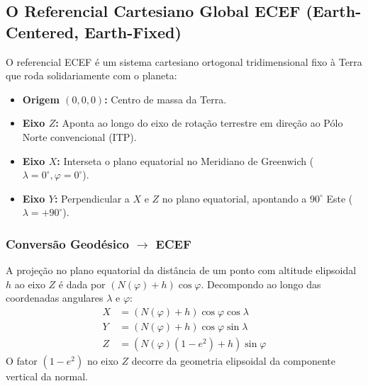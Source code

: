 \documentclass[11pt,a4paper]{article}
\begin{document}
\subsection{O Referencial Cartesiano Global ECEF (Earth-Centered, Earth-Fixed)}
O referencial ECEF é um sistema cartesiano ortogonal tridimensional fixo à Terra que roda solidariamente com o planeta:
\begin{itemize}
    \item \textbf{Origem $(0,0,0)$:} Centro de massa da Terra.
    \item \textbf{Eixo $Z$:} Aponta ao longo do eixo de rotação terrestre em direção ao Pólo Norte convencional (ITP).
    \item \textbf{Eixo $X$:} Interseta o plano equatorial no Meridiano de Greenwich ($\lambda = 0^\circ, \varphi = 0^\circ$).
    \item \textbf{Eixo $Y$:} Perpendicular a $X$ e $Z$ no plano equatorial, apontando a $90^\circ$ Este ($\lambda = +90^\circ$).
\end{itemize}

\subsubsection{Conversão Geodésico $\to$ ECEF}
A projeção no plano equatorial da distância de um ponto com altitude elipsoidal $h$ ao eixo $Z$ é dada por $(N(\varphi) + h)\cos\varphi$. Decompondo ao longo das coordenadas angulares $\lambda$ e $\varphi$:
\begin{align}
    \label{eq:geodetic_to_ecef}
    X &= (N(\varphi) + h) \cos\varphi \cos\lambda \\
    Y &= (N(\varphi) + h) \cos\varphi \sin\lambda \\
    Z &= \left(N(\varphi)(1 - e^2) + h\right) \sin\varphi
\end{align}
O fator $(1 - e^2)$ no eixo $Z$ decorre da geometria elipsoidal da componente vertical da normal.
\end{document}
